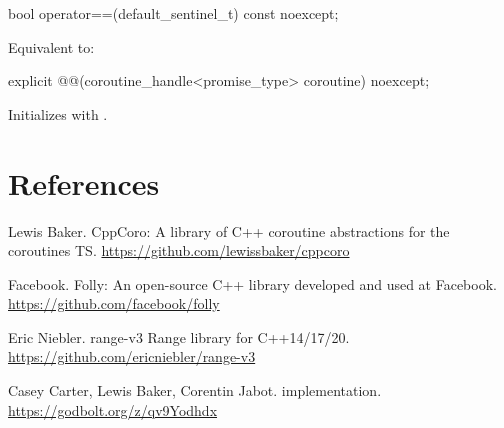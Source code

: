 \documentclass{wg21}
\begin{document}
\begin{addedblock}
\begin{itemdecl}
bool operator==(default_sentinel_t) const noexcept;
\end{itemdecl}

\begin{itemdescr}
\effects
Equivalent to: 
\end{itemdescr}

\begin{itemdecl}
explicit @@(coroutine_handle<promise_type> coroutine) noexcept;
\end{itemdecl}

\begin{itemdescr}
\effects
Initializes  with .
\end{itemdescr}

\end{addedblock}

\newpage
\section{References}
\renewcommand{\section}[2]{}%



\begin{thebibliography}{9}
    Lewis Baker.
    CppCoro: A library of C++ coroutine abstractions for the coroutines TS.
    \url{https://github.com/lewissbaker/cppcoro}

    Facebook.
    Folly: An open-source C++ library developed and used at Facebook.
    \url{https://github.com/facebook/folly}

    Eric Niebler.
    range-v3 Range library for C++14/17/20.
    \url{https://github.com/ericniebler/range-v3}

    Casey Carter, Lewis Baker, Corentin Jabot.
     implementation.
    \url{https://godbolt.org/z/qv9Yodhdx}
\end{thebibliography}
\end{document}
